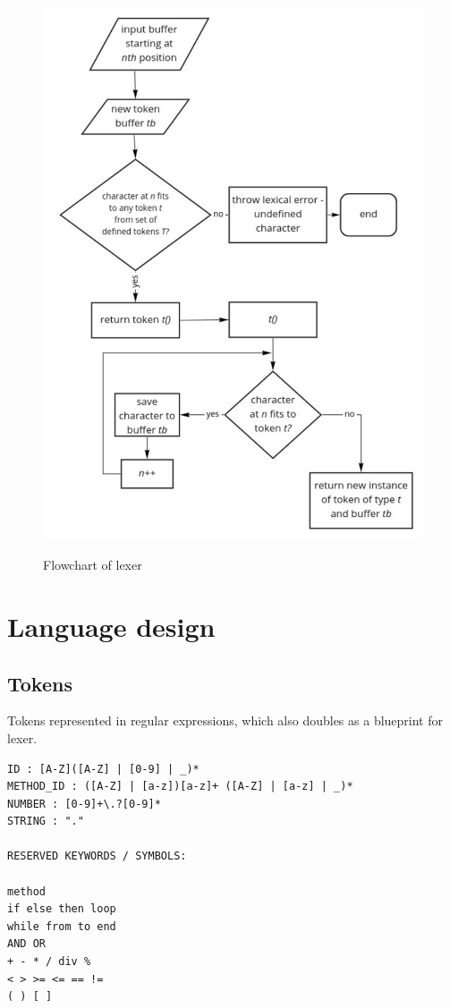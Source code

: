 \documentclass{article}
\begin{document}
    \begin{figure}[H]
        \centering
        \caption{Flowchart of lexer}
        \includegraphics[width=\linewidth]{lexer_flowchart}
        \label{fig:lexer_flow}
    \end{figure}


\section{Language design}

\subsection{Tokens}

    Tokens represented in regular expressions, which also doubles as a blueprint 
    for lexer.

\begin{verbatim}
ID : [A-Z]([A-Z] | [0-9] | _)*
METHOD_ID : ([A-Z] | [a-z])[a-z]+ ([A-Z] | [a-z] | _)*
NUMBER : [0-9]+\.?[0-9]*
STRING : "."

RESERVED KEYWORDS / SYMBOLS:

method
if else then loop
while from to end
AND OR
+ - * / div %
< > >= <= == !=
( ) [ ]
\end{verbatim}
\end{document}
